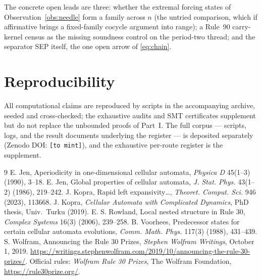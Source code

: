 \documentclass[11pt]{article}
\theoremstyle{definition}
\begin{document}
The concrete open leads are three: whether the extremal forcing states of
Observation~\ref{obs:needle} form a family across $n$ (the untried comparison,
which if affirmative brings a fixed-family cocycle argument into range); a
Rule~90 carry-kernel census as the missing soundness control on the period-two
thread; and the separator SEP itself, the one open arrow of \eqref{eq:chain}.

\section{Reproducibility}
\label{sec:repro}


All computational claims are reproduced by scripts in the accompanying archive,
seeded and cross-checked; the exhaustive audits and SMT certificates supplement
but do not replace the unbounded proofs of Part~I. The full corpus --- scripts,
logs, and the result documents underlying the register --- is deposited
separately (Zenodo DOI: \texttt{[to mint]}), and the exhaustive per-route
register is the supplement.

\begin{thebibliography}{9}\footnotesize
{} E. Jen, Aperiodicity in one-dimensional cellular automata,
\emph{Physica D} 45(1--3) (1990), 3--18.
 E. Jen, Global properties of cellular automata,
\emph{J. Stat. Phys.} 43(1--2) (1986), 219--242.
 J. Kopra, Rapid left expansivity\ldots, \emph{Theoret. Comput.
Sci.} 946 (2023), 113668.
 J. Kopra, \emph{Cellular Automata with Complicated
Dynamics}, PhD thesis, Univ.\ Turku (2019).
 E. S. Rowland, Local nested structure in Rule 30,
\emph{Complex Systems} 16(3) (2006), 239--258.
 B. Voorhees, Predecessor states for certain cellular automata
evolutions, \emph{Comm. Math. Phys.} 117(3) (1988), 431--439.
 S. Wolfram, Announcing the Rule 30 Prizes,
\emph{Stephen Wolfram Writings}, October 1, 2019.
\url{https://writings.stephenwolfram.com/2019/10/announcing-the-rule-30-prizes/}.
Official rules: \emph{Wolfram Rule 30 Prizes}, The Wolfram Foundation,
\url{https://rule30prize.org/}.
\end{thebibliography}
\end{document}
